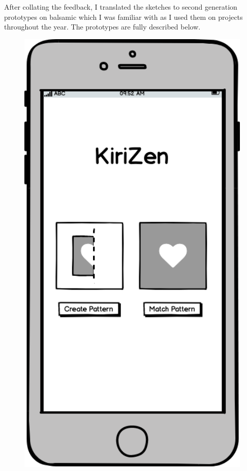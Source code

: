 \documentclass[11pt]{article}
\begin{document}
        After collating the feedback, I translated the sketches to second generation prototypes on balsamic \cite{Balsamiq} which I was familiar with as I used them on projects throughout the year. The prototypes are fully described below. 
    
\clearpage
             \begin{figure}
                \begin{minipage}[c]{0.35\textwidth}
                \includegraphics[width=1\textwidth]{Images/Prototype/prototypeHomeScreen}

\end{minipage}
\end{figure}
\end{document}
